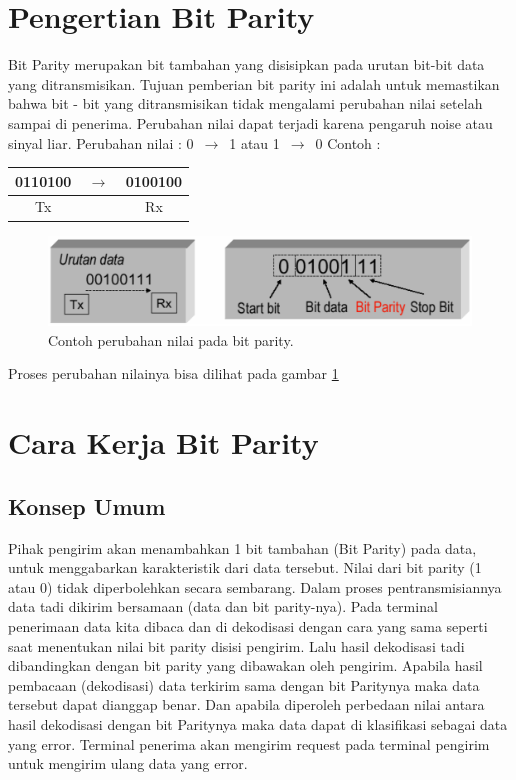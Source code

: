 
\section{Pengertian Bit Parity}
Bit Parity merupakan bit tambahan yang disisipkan pada urutan bit-bit data yang ditransmisikan.
Tujuan pemberian bit parity ini adalah untuk memastikan bahwa bit - bit yang ditransmisikan tidak mengalami perubahan nilai setelah sampai di penerima.
Perubahan nilai dapat terjadi karena pengaruh noise atau sinyal liar.
Perubahan nilai : 0 $\,\to\,$ 1 atau 1 $\,\to\,$ 0
\newline Contoh :

\begin{table}[h!]
\centering
\begin{tabular}{ c c c }
0110100 & $\,\to\,$ &  0100100\\
\hline
Tx &  & Rx \\
\end{tabular}
\end{table}

\begin{figure}[ht]
\centerline{\includegraphics[width=1\textwidth]{figures/perubahan_nilai_bit_parity.png}}
\caption{Contoh perubahan nilai pada bit parity.}
\label{perubahan_nilai_bit_parity}
\end{figure}

Proses perubahan nilainya bisa dilihat pada gambar \ref{perubahan_nilai_bit_parity}

\section{Cara Kerja Bit Parity}
\subsection{Konsep Umum}
Pihak pengirim akan menambahkan 1 bit tambahan (Bit Parity) pada data, untuk menggabarkan karakteristik dari data tersebut. Nilai dari bit parity (1 atau 0) tidak diperbolehkan secara sembarang. Dalam proses pentransmisiannya data tadi dikirim bersamaan (data dan bit parity-nya). Pada terminal penerimaan data kita dibaca dan di dekodisasi dengan cara yang sama seperti saat menentukan nilai bit parity disisi pengirim. Lalu hasil dekodisasi tadi dibandingkan dengan bit parity yang dibawakan oleh pengirim.
Apabila hasil pembacaan (dekodisasi) data terkirim sama dengan bit Paritynya maka data tersebut dapat dianggap benar. Dan apabila diperoleh perbedaan nilai antara hasil dekodisasi dengan bit Paritynya maka data dapat di klasifikasi sebagai data yang error. Terminal penerima akan mengirim request pada terminal pengirim untuk mengirim ulang data yang error.
 
